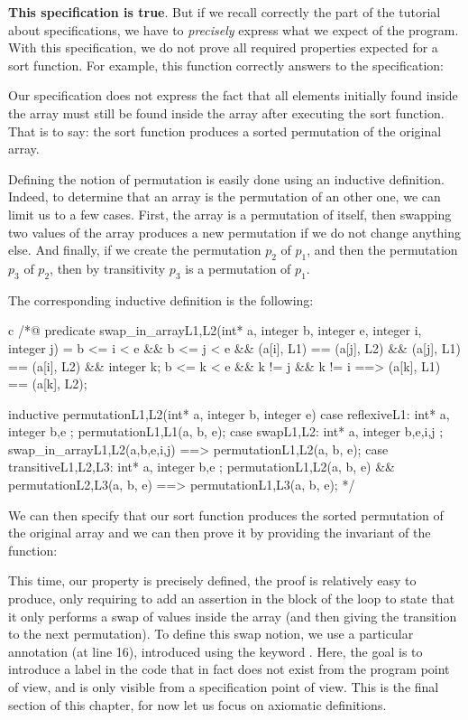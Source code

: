 

{\bf This specification is true}. But if we recall correctly the part of the
tutorial about specifications, we have to {\it precisely} express what we expect of
the program. With this specification, we do not prove all required properties
expected for a sort function. For example, this function correctly answers to
the specification:




Our specification does not express the fact that all elements initially found
inside the array must still be found inside the array after executing the
sort function. That is to say: the sort function produces a sorted permutation
of the original array.

Defining the notion of permutation is easily done using an inductive definition.
Indeed, to determine that an array is the permutation of an other one, we can
limit us to a few cases. First, the array is a permutation of itself, then
swapping two values of the array produces a new permutation if we do not change
anything else. And finally, if we create the permutation $p_2$ of $p_1$, and then
the permutation $p_3$ of $p_2$, then by transitivity $p_3$ is a permutation of
$p_1$.

The corresponding inductive definition is the following:

\begin{CodeBlock}{c}
/*@
  predicate swap_in_array{L1,L2}(int* a, integer b, integer e, integer i, integer j) =
    b <= i < e && b <= j < e &&
    \at(a[i], L1) == \at(a[j], L2) &&
    \at(a[j], L1) == \at(a[i], L2) &&
    \forall integer k; b <= k < e && k != j && k != i ==>
      \at(a[k], L1) == \at(a[k], L2);

  inductive permutation{L1,L2}(int* a, integer b, integer e){
  case reflexive{L1}: 
    \forall int* a, integer b,e ; permutation{L1,L1}(a, b, e);
  case swap{L1,L2}:
    \forall int* a, integer b,e,i,j ;
      swap_in_array{L1,L2}(a,b,e,i,j) ==> permutation{L1,L2}(a, b, e);
  case transitive{L1,L2,L3}:
    \forall int* a, integer b,e ; 
      permutation{L1,L2}(a, b, e) && permutation{L2,L3}(a, b, e) ==> permutation{L1,L3}(a, b, e);
  }
*/
\end{CodeBlock}

We can then specify that our sort function produces the sorted permutation of
the original array and we can then prove it by providing the invariant of the
function:





This time, our property is precisely defined, the proof is relatively easy to
produce, only requiring to add an assertion in the block of the loop to state
that it only performs a swap of values inside the array (and then giving
the transition to the next permutation). To define this swap notion, we use
a particular annotation (at line 16), introduced using the keyword
. Here, the goal is to introduce a label in the code that in
fact does not exist from the program point of view, and is only visible from
a specification point of view. This is the final section of this chapter, for
now let us focus on axiomatic definitions.
